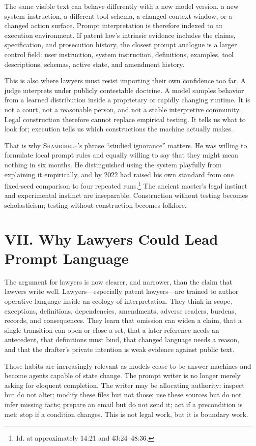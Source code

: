 \documentclass[11pt]{article}
\newcommand{\sham}{\textsc{Shambibble}\xspace}
\begin{document}
The same visible text can behave differently with a new model version, a new system instruction, a different tool schema, a changed context window, or a changed action surface. Prompt interpretation is therefore indexed to an execution environment. If patent law's intrinsic evidence includes the claims, specification, and prosecution history, the closest prompt analogue is a larger control field: user instruction, system instruction, definitions, examples, tool descriptions, schemas, active state, and amendment history.

This is also where lawyers must resist importing their own confidence too far. A judge interprets under publicly contestable doctrine. A model samples behavior from a learned distribution inside a proprietary or rapidly changing runtime. It is not a court, not a reasonable person, and not a stable interpretive community. Legal construction therefore cannot replace empirical testing. It tells us what to look for; execution tells us which constructions the machine actually makes.

That is why \sham's phrase ``studied ignorance'' matters. He was willing to formulate local prompt rules and equally willing to say that they might mean nothing in six months. He distinguished using the system playfully from explaining it empirically, and by 2022 had raised his own standard from one fixed-seed comparison to four repeated runs.\footnote{Id. at approximately 14:21 and 43:24--48:36.} The ancient master's legal instinct and experimental instinct are inseparable. Construction without testing becomes scholasticism; testing without construction becomes folklore.

\section*{VII. Why Lawyers Could Lead Prompt Language}
The argument for lawyers is now clearer, and narrower, than the claim that lawyers write well. Lawyers---especially patent lawyers---are trained to author operative language inside an ecology of interpretation. They think in scope, exceptions, definitions, dependencies, amendments, adverse readers, burdens, records, and consequences. They learn that omission can widen a claim, that a single transition can open or close a set, that a later reference needs an antecedent, that definitions must bind, that changed language needs a reason, and that the drafter's private intention is weak evidence against public text.

Those habits are increasingly relevant as models cease to be answer machines and become agents capable of state change. The prompt writer is no longer merely asking for eloquent completion. The writer may be allocating authority: inspect but do not alter; modify these files but not those; use these sources but do not infer missing facts; prepare an email but do not send it; act if a precondition is met; stop if a condition changes. This is not legal work, but it is boundary work.
\end{document}

